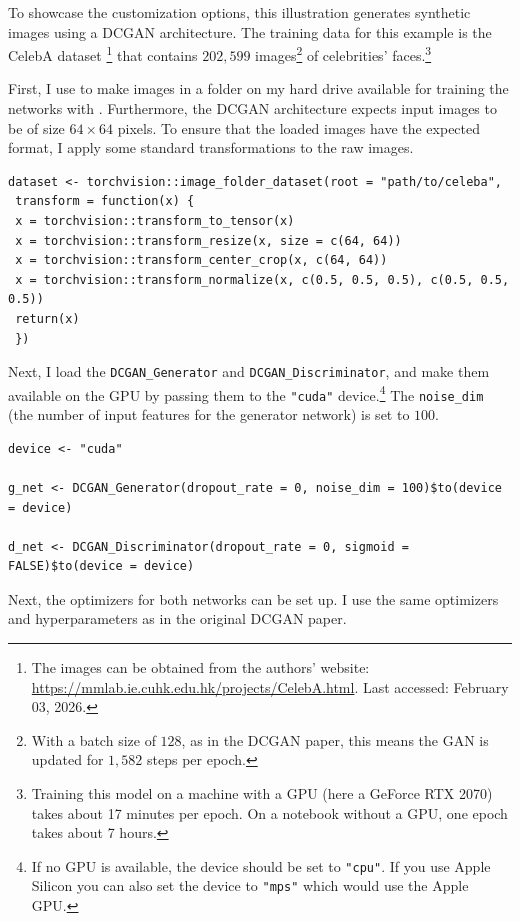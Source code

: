 To showcase the  customization options, this illustration generates synthetic images using a DCGAN \citep{radford2016} architecture. The training data for this example is the CelebA dataset \citep{liu2015faceattributes}\footnote{The images can be obtained from the authors' website:
  \url{https://mmlab.ie.cuhk.edu.hk/projects/CelebA.html}. Last accessed:
  February 03, 2026.} that contains \(202,599\) images\footnote{With a batch size of \(128\), as in the DCGAN paper, this means the
  GAN is updated for \(1,582\) steps per epoch.} of celebrities' faces.\footnote{Training this model on a machine with a GPU (here a GeForce RTX
  2070) takes about 17 minutes per epoch. On a notebook without a GPU,
  one epoch takes about 7 hours.}

First, I use  to make images in a folder on my hard drive available for training the networks with . Furthermore, the DCGAN architecture expects input images to be of size \(64\times64\) pixels. To ensure that the loaded images have the expected format, I apply some standard
transformations to the raw images.

\begin{verbatim}
dataset <- torchvision::image_folder_dataset(root = "path/to/celeba",
 transform = function(x) {
 x = torchvision::transform_to_tensor(x)
 x = torchvision::transform_resize(x, size = c(64, 64))
 x = torchvision::transform_center_crop(x, c(64, 64))
 x = torchvision::transform_normalize(x, c(0.5, 0.5, 0.5), c(0.5, 0.5, 0.5))
 return(x)
 })
\end{verbatim}

Next, I load the \texttt{DCGAN\_Generator} and \texttt{DCGAN\_Discriminator}, and make them available on the GPU by passing them to the \texttt{"cuda"} device.\footnote{If no GPU is available, the device should be set to \texttt{"cpu"}. If you use
  Apple Silicon you can also set the device to \texttt{"mps"} which would use the
  Apple GPU.} The \texttt{noise\_dim} (the number of input features for the generator network) is set to \(100\).

\begin{verbatim}
device <- "cuda"

g_net <- DCGAN_Generator(dropout_rate = 0, noise_dim = 100)$to(device = device)

d_net <- DCGAN_Discriminator(dropout_rate = 0, sigmoid = FALSE)$to(device = device)
\end{verbatim}

Next, the optimizers for both networks can be set up. I use the same
optimizers and hyperparameters as \citet{radford2016} in the original DCGAN
paper.

